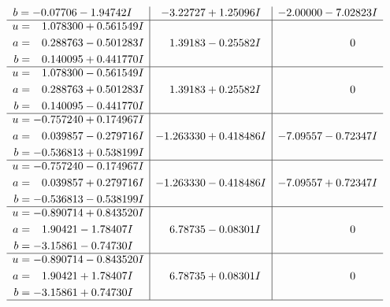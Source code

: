 \documentclass[1p]{elsarticle_modified}
\theoremstyle{definition}
\begin{document}
$$\begin{array}{c|c|c}
\begin{aligned}
b &= -0.07706 - 1.94742 I\end{aligned}
 & -3.22727 + 1.25096 I & -2.00000 - 7.02823 I \\ \hline\begin{aligned}
u &= \phantom{-}1.078300 + 0.561549 I \\
a &= \phantom{-}0.288763 - 0.501283 I \\
b &= \phantom{-}0.140095 + 0.441770 I\end{aligned}
 & \phantom{-}1.39183 - 0.25582 I & \phantom{-0.000000 } 0 \\ \hline\begin{aligned}
u &= \phantom{-}1.078300 - 0.561549 I \\
a &= \phantom{-}0.288763 + 0.501283 I \\
b &= \phantom{-}0.140095 - 0.441770 I\end{aligned}
 & \phantom{-}1.39183 + 0.25582 I & \phantom{-0.000000 } 0 \\ \hline\begin{aligned}
u &= -0.757240 + 0.174967 I \\
a &= \phantom{-}0.039857 - 0.279716 I \\
b &= -0.536813 + 0.538199 I\end{aligned}
 & -1.263330 + 0.418486 I & -7.09557 - 0.72347 I \\ \hline\begin{aligned}
u &= -0.757240 - 0.174967 I \\
a &= \phantom{-}0.039857 + 0.279716 I \\
b &= -0.536813 - 0.538199 I\end{aligned}
 & -1.263330 - 0.418486 I & -7.09557 + 0.72347 I \\ \hline\begin{aligned}
u &= -0.890714 + 0.843520 I \\
a &= \phantom{-}1.90421 - 1.78407 I \\
b &= -3.15861 - 0.74730 I\end{aligned}
 & \phantom{-}6.78735 - 0.08301 I & \phantom{-0.000000 } 0 \\ \hline\begin{aligned}
u &= -0.890714 - 0.843520 I \\
a &= \phantom{-}1.90421 + 1.78407 I \\
b &= -3.15861 + 0.74730 I\end{aligned}
 & \phantom{-}6.78735 + 0.08301 I & \phantom{-0.000000 } 0\\
 \hline 
 \end{array}$$\newpage$$\begin{array}{c|c|c}  

\end{array}$$
\end{document}
